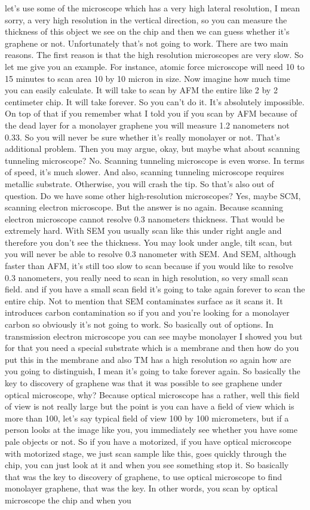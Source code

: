 let's use some of the microscope which has a very high lateral resolution, I mean sorry, a very high resolution in the vertical direction, so you can measure the thickness of this object we see on the chip and then we can guess whether it's graphene or not. Unfortunately that's not going to work. There are two main reasons. The first reason is that the high resolution microscopes are very slow. So let me give you an example. For instance, atomic force microscope will need 10 to 15 minutes to scan area 10 by 10 micron in size. Now imagine how much time you can easily calculate. It will take to scan by AFM the entire like 2 by 2 centimeter chip. It will take forever. So you can't do it. It's absolutely impossible. On top of that if you remember what I told you if you scan by AFM because of the dead layer for a monolayer graphene you will measure 1.2 nanometers not 0.33. So you will never be sure whether it's really monolayer or not. That's additional problem. Then you may argue, okay, but maybe what about scanning tunneling microscope? No. Scanning tunneling microscope is even worse. In terms of speed, it's much slower. And also, scanning tunneling microscope requires metallic substrate. Otherwise, you will crash the tip. So that's also out of question. Do we have some other high-resolution microscopes? Yes, maybe SCM, scanning electron microscope. But the answer is no again. Because scanning electron microscope cannot resolve 0.3 nanometers thickness. That would be extremely hard. With SEM you usually scan like this under right angle and therefore you don't see the thickness. You may look under angle, tilt scan, but you will never be able to resolve 0.3 nanometer with SEM. And SEM, although faster than AFM, it's still too slow to scan because if you would like to resolve 0.3 nanometers, you really need to scan in high resolution, so very small scan field. and if you have a small scan field it's going to take again forever to scan the entire chip. Not to mention that SEM contaminates surface as it scans it. It introduces carbon contamination so if you and you're looking for a monolayer carbon so obviously it's not going to work. So basically out of options. In transmission electron microscope you can see maybe monolayer I showed you but for that you need a special substrate which is a membrane and then how do you put this in the membrane and also TM has a high resolution so again how are you going to distinguish, I mean it's going to take forever again. So basically the key to discovery of graphene was that it was possible to see graphene under optical microscope, why? Because optical microscope has a rather, well this field of view is not really large but the point is you can have a field of view which is more than 100, let's say typical field of view 100 by 100 micrometers, but if a person looks at the image like you, you immediately see whether you have some pale objects or not. So if you have a motorized, if you have optical microscope with motorized stage, we just scan sample like this, goes quickly through the chip, you can just look at it and when you see something stop it. So basically that was the key to discovery of graphene, to use optical microscope to find monolayer graphene, that was the key. In other words, you scan by optical microscope the chip and when you 
